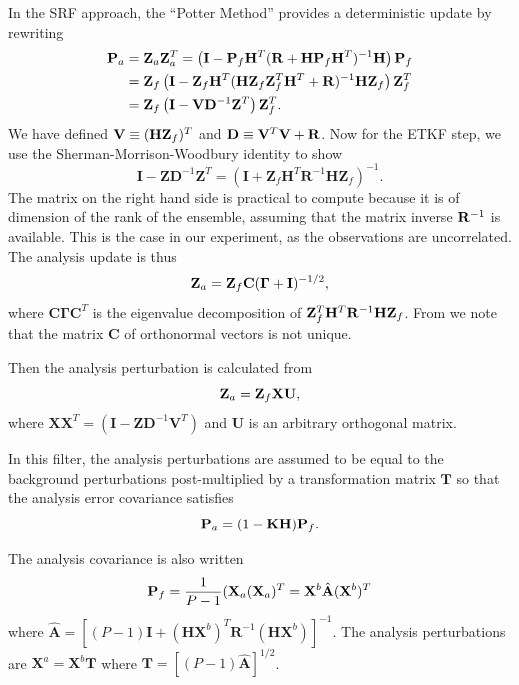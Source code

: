 \documentclass[12pt]{report}
\begin{document}
In the SRF approach, the ``Potter Method'' provides a deterministic update by rewriting
\begin{align} \mathbf{P}_a &= \mathbf{Z}_a \mathbf{Z}_a^T = \left(\mathbf{I}-\mathbf{P}_f\mathbf{H}^T(\mathbf{R}+\mathbf{H}\mathbf{P}_f\mathbf{H}^T)^{-1}\mathbf{H}\right)\mathbf{P}_f \\
&= \mathbf{Z}_f\left(\mathbf{I}-\mathbf{Z}_f\mathbf{H}^T(\mathbf{H}\mathbf{Z}_f\mathbf{Z}_f^T\mathbf{H}^T+\mathbf{R})^{-1}\mathbf{H}\mathbf{Z}_f\right)\mathbf{Z}_f^T\\
&= \mathbf{Z}_f\left(\mathbf{I}-\mathbf{V}\mathbf{D}^{-1}\mathbf{Z}^T\right)\mathbf{Z}_f^T. \end{align}
We have defined $\mathbf{V}\equiv(\mathbf{H}\mathbf{Z}_f)^T$ and $\mathbf{D}\equiv\mathbf{V}^T\mathbf{V}+\mathbf{R}$.
Now for the ETKF step, we use the Sherman-Morrison-Woodbury identity to show
\begin{equation} \mathbf{I} - \mathbf{Z}\mathbf{D}^{-1}\mathbf{Z}^T = (\mathbf{I}+\mathbf{Z}_f\mathbf{H}^T\mathbf{R}^{-1}\mathbf{H}\mathbf{Z}_f)^{-1}.\end{equation}
The matrix on the right hand side is practical to compute because it is of dimension of the rank of the ensemble, assuming that the matrix inverse $\mathbf{R}^{-1}$ is available.
This is the case in our experiment, as the observations are uncorrelated.
The analysis update is thus
\begin{equation} \mathbf{Z}_a = \mathbf{Z}_f \mathbf{C}(\mathbf{\Gamma} +\mathbf{I})^{-1/2} ,\end{equation}
where $\mathbf{C}\mathbf{\Gamma}\mathbf{C}^T$ is the eigenvalue decomposition of $\mathbf{Z}_f^T\mathbf{H}^T\mathbf{R}^{-1}\mathbf{H}\mathbf{Z}_f$.
From  we note that the matrix $\mathbf{C}$ of orthonormal vectors is not unique.

Then the analysis perturbation is calculated from
\begin{equation} \mathbf{Z}_a = \mathbf{Z}_f \mathbf{X} \mathbf{U}, \end{equation}
where $\mathbf{X}\mathbf{X}^T = (\mathbf{I}-\mathbf{Z}\mathbf{D}^{-1}\mathbf{V}^T)$ and $\mathbf{U}$ is an arbitrary orthogonal matrix.

In this filter, the analysis perturbations are assumed to be equal to the background perturbations post-multiplied by a transformation matrix $\mathbf{T}$ so that the analysis error covariance satisfies
$$ \mathbf{P}_a = (1- \mathbf{K} \mathbf{H} ) \mathbf{P}_f .$$

The analysis covariance is also written
$$ \mathbf{P}_f = \frac{1}{P-1} ( \mathbf{X}_a (\mathbf{X}_a) ^T = \mathbf{X} ^b \hat{\mathbf{A}} (\mathbf{X} ^b) ^T $$
where $\hat{\mathbf{A}} = [(P-1) \mathbf{I} + (\mathbf{H} \mathbf{X} ^b ) ^T \mathbf{R} ^{-1} (\mathbf{H} \mathbf{X} ^b ) ] ^{-1} $.
The analysis perturbations are $\mathbf{X} ^a = \mathbf{X} ^b \mathbf{T}$ where $\mathbf{T} = [(P-1)\hat{\mathbf{A}} ] ^{1/2} $.
\end{document}
